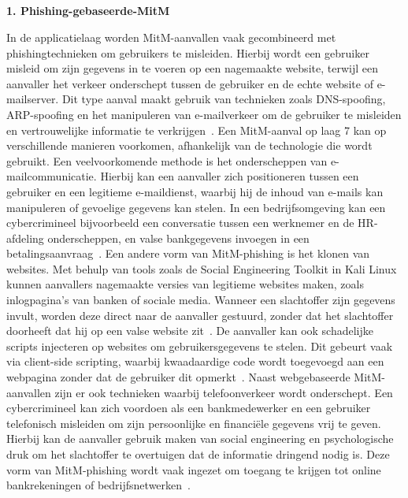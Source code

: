 \subsection{}
\label{sec:MitM-aanvallen op de Application}

\vspace{0.5cm}
\textbf{1. Phishing-gebaseerde-MitM}

In de applicatielaag worden MitM-aanvallen vaak gecombineerd met phishingtechnieken om gebruikers te misleiden. Hierbij wordt een gebruiker misleid om zijn gegevens in te voeren op een nagemaakte website, terwijl een aanvaller het verkeer onderschept tussen de gebruiker en de echte website of e-mailserver. Dit type aanval maakt gebruik van technieken zoals DNS-spoofing, ARP-spoofing en het manipuleren van e-mailverkeer om de gebruiker te misleiden en vertrouwelijke informatie te verkrijgen~\autocite{birlea2020}.
Een MitM-aanval op laag 7 kan op verschillende manieren voorkomen, afhankelijk van de technologie die wordt gebruikt. Een veelvoorkomende methode is het onderscheppen van e-mailcommunicatie. Hierbij kan een aanvaller zich positioneren tussen een gebruiker en een legitieme e-maildienst, waarbij hij de inhoud van e-mails kan manipuleren of gevoelige gegevens kan stelen. In een bedrijfsomgeving kan een cybercrimineel bijvoorbeeld een conversatie tussen een werknemer en de HR-afdeling onderscheppen, en valse bankgegevens invoegen in een betalingsaanvraag~\autocite{birlea2020}.
Een andere vorm van MitM-phishing is het klonen van websites. Met behulp van tools zoals de Social Engineering Toolkit in Kali Linux kunnen aanvallers nagemaakte versies van legitieme websites maken, zoals inlogpagina’s van banken of sociale media. Wanneer een slachtoffer zijn gegevens invult, worden deze direct naar de aanvaller gestuurd, zonder dat het slachtoffer doorheeft dat hij op een valse website zit~\autocite{birlea2020}. De aanvaller kan ook schadelijke scripts injecteren op websites om gebruikersgegevens te stelen. Dit gebeurt vaak via client-side scripting, waarbij kwaadaardige code wordt toegevoegd aan een  webpagina zonder dat de gebruiker dit opmerkt~\autocite{birlea2020}.
Naast webgebaseerde MitM-aanvallen zijn er ook technieken waarbij telefoonverkeer wordt onderschept. Een cybercrimineel kan zich voordoen als een bankmedewerker en een gebruiker telefonisch misleiden om zijn persoonlijke en financiële gegevens vrij te geven. Hierbij kan de aanvaller gebruik maken van social engineering en psychologische druk om het slachtoffer te overtuigen dat de informatie dringend nodig is. Deze vorm van MitM-phishing wordt vaak ingezet om toegang te krijgen tot online bankrekeningen of bedrijfsnetwerken~\autocite{birlea2020}.
